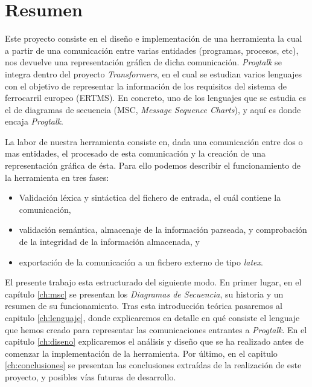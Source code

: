 \chapter*{Resumen}

Este proyecto
consiste en el diseño e implementación de una herramienta la cual a
partir de una comunicación entre varias entidades (programas,
procesos, etc), nos devuelve una representación gráfica de dicha
comunicación. \textit{Progtalk} se integra dentro del proyecto
\textit{Transformers}, en el cual se estudian varios lenguajes con el
objetivo de representar la información de los requisitos del sistema
de ferrocarril europeo (ERTMS). En concreto, uno de los lenguajes que
se estudia es el de diagramas de secuencia (MSC, \emph{Message
  Sequence Charts}), y aquí es donde encaja
\textit{Progtalk}. 

La labor de nuestra herramienta consiste en, dada una comunicación
entre dos o mas entidades, el procesado de esta comunicación y la
creación de una representación gráfica de ésta. Para ello podemos
describir el funcionamiento de la herramienta en tres fases:

\begin{itemize}
\item Validación léxica y sintáctica del fichero de entrada, el cuál
  contiene la comunicación,
\item validación semántica, almacenaje de la información parseada, y
  comprobación de la integridad de la información almacenada, y
\item exportación de la comunicación a un fichero externo de tipo
  \textit{latex}.
\end{itemize}

El presente trabajo esta estructurado del siguiente modo. En primer
lugar, en el capítulo \ref{ch:msc} se presentan los \textit{Diagramas
  de Secuencia}, su historia y un resumen de su funcionamiento. Tras
esta introducción teórica pasaremos al capitulo \ref{ch:lenguaje},
donde explicaremos en detalle en qué consiste el lenguaje que hemos
creado para representar las comunicaciones entrantes a
\textit{Progtalk}. En el capitulo \ref{ch:diseno} explicaremos el
análisis y diseño que se ha realizado antes de comenzar la
implementación de la herramienta. Por último, en el capitulo
\ref{ch:conclusiones} se presentan las conclusiones extraídas de la
realización de este proyecto, y posibles vías futuras de desarrollo.

